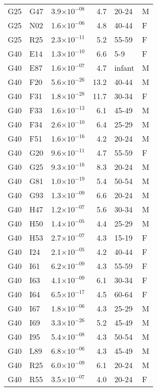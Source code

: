 \begin{longtable}{lllrll}
   G25 & G47 & 3.9$\times10^{-08}$ & 4.7 & 20-24 & M \\ 
   G25 & N02 & 1.6$\times10^{-06}$ & 4.8 & 40-44 & F \\ 
   G25 & R25 & 2.3$\times10^{-11}$ & 5.2 & 55-59 & F \\ 
   G40 & E14 & 1.3$\times10^{-10}$ & 6.6 & 5-9 & F \\ 
   G40 & E87 & 1.6$\times10^{-07}$ & 4.7 & infant & M \\ 
   G40 & F20 & 5.6$\times10^{-26}$ & 13.2 & 40-44 & M \\ 
   G40 & F31 & 1.8$\times10^{-28}$ & 11.7 & 30-34 & F \\ 
   G40 & F33 & 1.6$\times10^{-13}$ & 6.1 & 45-49 & M \\ 
   G40 & F34 & 2.6$\times10^{-10}$ & 6.4 & 25-29 & M \\ 
   G40 & F51 & 1.6$\times10^{-16}$ & 4.2 & 20-24 & M \\ 
   G40 & G20 & 9.6$\times10^{-11}$ & 4.7 & 55-59 & F \\ 
   G40 & G25 & 9.3$\times10^{-16}$ & 8.3 & 20-24 & M \\ 
   G40 & G81 & 1.0$\times10^{-19}$ & 5.4 & 50-54 & M \\ 
   G40 & G93 & 1.3$\times10^{-09}$ & 6.6 & 20-24 & M \\ 
   G40 & H47 & 1.2$\times10^{-07}$ & 5.6 & 30-34 & M \\ 
   G40 & H50 & 1.4$\times10^{-05}$ & 4.4 & 25-29 & M \\ 
   G40 & H53 & 2.7$\times10^{-07}$ & 4.3 & 15-19 & F \\ 
   G40 & I24 & 2.1$\times10^{-05}$ & 4.2 & 40-44 & F \\ 
   G40 & I61 & 6.2$\times10^{-09}$ & 4.3 & 55-59 & F \\ 
   G40 & I63 & 4.1$\times10^{-09}$ & 6.1 & 30-34 & F \\ 
   G40 & I64 & 6.5$\times10^{-17}$ & 4.5 & 60-64 & F \\ 
   G40 & I67 & 1.8$\times10^{-06}$ & 4.3 & 25-29 & M \\ 
   G40 & I69 & 3.3$\times10^{-26}$ & 5.2 & 45-49 & M \\ 
   G40 & I95 & 5.4$\times10^{-08}$ & 4.3 & 50-54 & M \\ 
   G40 & L89 & 6.8$\times10^{-06}$ & 4.3 & 45-49 & M \\ 
   G40 & R25 & 6.0$\times10^{-09}$ & 6.1 & 20-24 & M \\ 
   G40 & R55 & 3.5$\times10^{-07}$ & 4.0 & 20-24 & F \\ 

\end{longtable}
